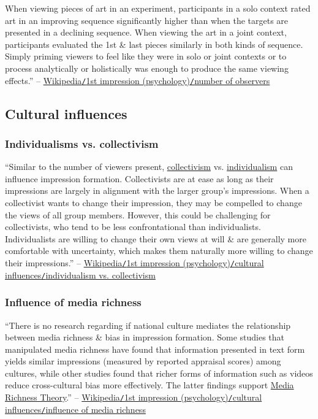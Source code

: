 \documentclass[oneside]{book}
\numberwithin{equation}{section}
\begin{document}
When viewing pieces of art in an experiment, participants in a solo context rated art in an improving sequence significantly higher than when the targets are presented in a declining sequence. When viewing the art in a joint context, participants evaluated the 1st \& last pieces similarly in both kinds of sequence. Simply priming viewers to feel like they were in solo or joint contexts or to process analytically or holistically was enough to produce the same viewing effects.'' -- \href{https://en.wikipedia.org/wiki/First_impression_(psychology)#Number_of_observers}{Wikipedia\texttt{/}1st impression (psychology)\texttt{/}number of observers}

\subsection{Cultural influences}

\subsubsection{Individualisms vs. collectivism}
``Similar to the number of viewers present, \href{https://en.wikipedia.org/wiki/Collectivism_and_individualism}{collectivism} vs. \href{https://en.wikipedia.org/wiki/Individualism}{individualism} can influence impression formation. Collectivists are at ease as long as their impressions are largely in alignment with the larger group's impressions. When a collectivist wants to change their impression, they may be compelled to change the views of all group members. However, this could be challenging for collectivists, who tend to be less confrontational than individualists. Individualists are willing to change their own views at will \& are generally more comfortable with uncertainty, which makes them naturally more willing to change their impressions.'' -- \href{https://en.wikipedia.org/wiki/First_impression_(psychology)#Individualism_versus_collectivism}{Wikipedia\texttt{/}1st impression (psychology)\texttt{/}cultural influences\texttt{/}individualism vs. collectivism}

\subsubsection{Influence of media richness}
``There is no research regarding if national culture mediates the relationship between media richness \& bias in impression formation. Some studies that manipulated media richness have found that information presented in  text form yields similar impressions (measured by reported appraisal scores) among cultures, while other studies found that richer forms of information such as videos reduce cross-cultural bias more effectively. The latter findings support \href{https://en.wikipedia.org/wiki/Media_Richness_Theory}{Media Richness Theory}.'' -- \href{https://en.wikipedia.org/wiki/First_impression_(psychology)#Influence_of_media_richness}{Wikipedia\texttt{/}1st impression (psychology)\texttt{/}cultural influences\texttt{/}influence of media richness}
\end{document}
